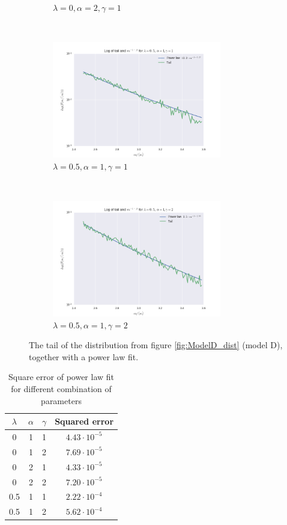 \documentclass[a4paper, 10pt]{article}
\begin{document}
\begin{figure}[!ht]
\begin{subfigure}[H!]{0.5\textwidth}
        \caption{$\lambda=0, \alpha = 2, \gamma=1$}
    \end{subfigure}%
     ~
    \begin{subfigure}[H!]{0.5\textwidth}
        \centering
        \includegraphics[height=2.0in]{tailL05A1G1.png}
        \caption{$\lambda=0.5, \alpha=1, \gamma=1$}
    \end{subfigure}
    ~
      \begin{subfigure}[H!]{0.5\textwidth}
        \centering
        \includegraphics[height=2.0in]{tailL05A1G2.png}
        \caption{$\lambda=0.5, \alpha=1, \gamma=2$}
    \end{subfigure}
\caption{The tail of the distribution from figure \ref{fig:ModelD_dist} (model D), together with a power law fit.}\label{fig:ModelD_tail}
\end{figure}
\begin{table}[!hb]
\centering
\caption{Square error of power law fit for different combination of parameters}\label{tab:parameters_D}
\begin{tabular}{|c|c|c|c|}
\hline
$\lambda$ & $\alpha$ & $\gamma$ & Squared error\\
\hline
0 & 1 & 1 & $4.43\cdot 10^{-5}$\\
0 & 1 & 2 & $7.69\cdot 10^{-5}$\\
0 & 2 & 1 & $4.33\cdot 10^{-5}$\\
0 & 2 & 2 & $7.20 \cdot 10^{-5}$\\
0.5 & 1 & 1 & $2.22\cdot 10^{-4}$\\
0.5 & 1 & 2 & $5.62\cdot 10^{-4}$\\
\hline
\end{tabular}
\end{table} 
\clearpage
\end{document}
